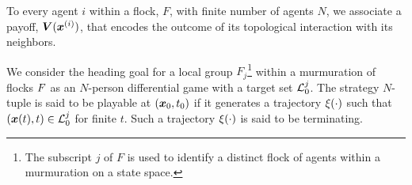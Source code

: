 
\begin{definition}
	To every agent $i$ within a flock, $F$, with finite number of agents $N$, we associate a payoff, $\bm{V}(\bm{x}^{(i)})$, that encodes the outcome of its topological interaction with its neighbors. 
	\label{def:payoff}
\end{definition}
%
%
\begin{definition}
	We consider the heading goal for a local group $F_j$\footnote{The subscript $j$ of $F$ is used to identify a distinct flock of agents within a murmuration on a state space.} within a murmuration of flocks $F$ as  an $N$-person differential game with a target set $\mathcal{L}_0^{j}$. The strategy $N$-tuple is said to be playable at $(\bm{x}_0, t_0)$ if it generates a trajectory $\xi(\cdot)$ such that $(\bm{x}(t), t) \in \mathcal{L}_0^{j}$ for finite $t$. Such a trajectory $\xi(\cdot)$ is said to be terminating.
\end{definition}
%

